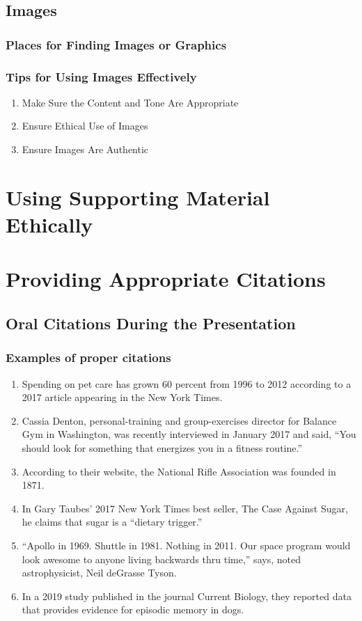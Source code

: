 \documentclass{report}
\begin{document}
        \subsection{Images}
            \subsubsection{Places for Finding Images or Graphics}
            \subsubsection{Tips for Using Images Effectively}
            \begin{enumerate}
                \item Make Sure the Content and Tone Are Appropriate
                \item Ensure Ethical Use of Images
                \item Ensure Images Are Authentic
            \end{enumerate}

    \section{Using Supporting Material Ethically}

    \section{Providing Appropriate Citations}
        \subsection{Oral Citations During the Presentation}
        \subsubsection{Examples of proper citations}
        \begin{enumerate}
            \item Spending on pet care has grown 60 percent from 1996 to 2012 according to a 2017 article appearing in the New York Times.
            \item Cassia Denton, personal-training and group-exercises director for Balance Gym in Washington, was recently interviewed in January 2017 and said, “You should look for something that energizes you in a fitness routine.”
            \item According to their website, the National Rifle Association was founded in 1871.
            \item In Gary Taubes' 2017 New York Times best seller, The Case Against Sugar, he claims that sugar is a “dietary trigger.”
            \item “Apollo in 1969. Shuttle in 1981. Nothing in 2011. Our space program would look awesome to anyone living backwards thru time,” says, noted astrophysicist, Neil deGrasse Tyson.
            \item In a 2019 study published in the journal Current Biology, they reported data that provides evidence for episodic memory in dogs.
        \end{enumerate}
\end{document}
